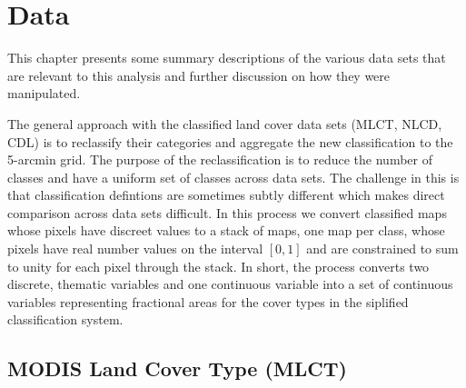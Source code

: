 


\chapter{Data}
\label{cha:data}

This chapter presents some summary descriptions of the various data
sets that are relevant to this analysis and further discussion on how
they were manipulated.

The general approach with the classified land cover data sets (MLCT,
NLCD, CDL) is to reclassify their categories and aggregate the new
classification to the 5-arcmin grid.  The purpose of the
reclassification is to reduce the number of classes and have a uniform
set of classes across data sets.  The challenge in this is that
classification defintions are sometimes subtly different which makes
direct comparison across data sets difficult.  In this process we
convert classified maps whose pixels have discreet values to a stack
of maps, one map per class, whose pixels have real number values on
the interval $[0,1]$ and are constrained to sum to unity for each
pixel through the stack.  In short, the process converts two discrete,
thematic variables and one continuous variable into a set of
continuous variables representing fractional areas for the cover types in
the siplified classification system.


\section{MODIS Land Cover Type (MLCT)}
\label{sec:mlct}




